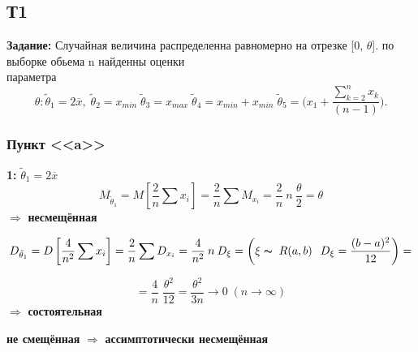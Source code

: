 \subsection{Т1}

\textbf{Задание:}
Случайная величина распределенна равномерно на отрезке [0, $\theta$]. по выборке обьема n найденны оценки \\
параметра 
\begin{equation*}
    \theta : \tilde\theta_1 = 2\overline{x}, \; 
             \tilde\theta_2 = x_{min} \;
             \tilde\theta_3 = x_{max} \;
             \tilde\theta_4 = x_{min} + x_{min} \;
             \tilde\theta_5 = \Bigg(x_1 + \frac{\sum\limits_{k=2}^n x_k}{(n-1)}\Bigg). 
\end{equation*}
\noindent


\subsubsection{Пункт <<a>>}
\vspace{1.5mm}
\textbf{1:} 
$\tilde\theta_1 = 2\overline{x}$ \\
\begin{equation*}
    M_{\tilde\theta_1} = M\left[ \frac{2}{n} \sum{x_i}\right] 
    = \frac{2}{n} \sum  M_{x_i} = \frac{2}{n} \:n\: \frac{\theta}{2} = \theta
\end{equation*}
$\Rightarrow$ \textbf{несмещённая}

\begin{equation*}
    D_{\tilde\theta_1} = D\left[ \frac{4}{n^2} \sum{x_i}\right] 
    = \frac{2}{n} \sum  D_{x_i} = \frac{4}{n^2} \:n\: D_{\xi} 
    = \left( \xi \thicksim \; R(a,b) \hspace{2.5 mm} D_{\xi} = \frac{(b-a)^2}{12}\right) =
\end{equation*}

\begin{equation*}
    = \frac{4}{n} \; \frac{\theta^2}{12} = \frac{\theta^2}{3n} \to 0 \; (n \to \infty)
\end{equation*}
$\Rightarrow$ \textbf{состоятельная}
\vspace{1.5 mm} \\
\begin{center}
    \textbf{не смещённая} $\Rightarrow$ \textbf{ассимптотически несмещённая}
\end{center}

